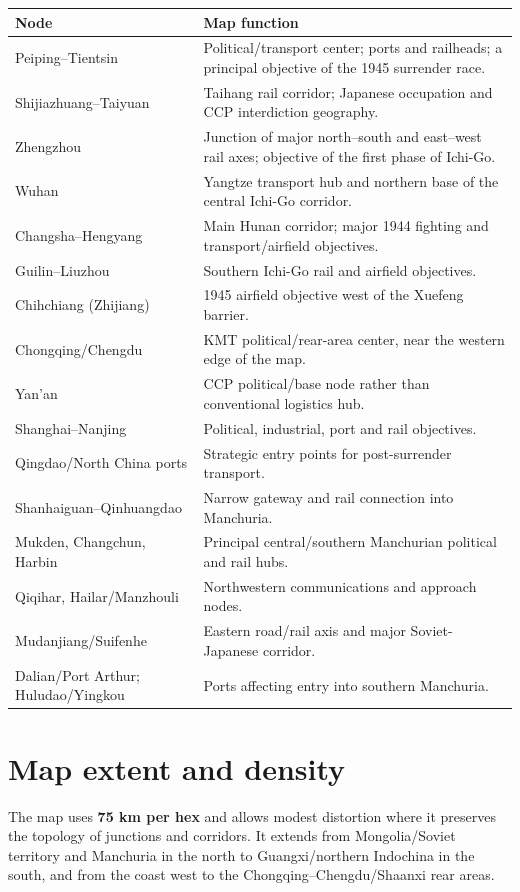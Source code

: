 \documentclass[11pt]{article}
\begin{document}
\begin{longtable}{p{}p{}}
\toprule Node & Map function \\\midrule\endhead
Peiping--Tientsin & Political/transport center; ports and railheads; a principal objective of the 1945 surrender race.\\
Shijiazhuang--Taiyuan & Taihang rail corridor; Japanese occupation and CCP interdiction geography.\\
Zhengzhou & Junction of major north--south and east--west rail axes; objective of the first phase of Ichi-Go.\\
Wuhan & Yangtze transport hub and northern base of the central Ichi-Go corridor.\\
Changsha--Hengyang & Main Hunan corridor; major 1944 fighting and transport/airfield objectives.\\
Guilin--Liuzhou & Southern Ichi-Go rail and airfield objectives.\\
Chihchiang (Zhijiang) & 1945 airfield objective west of the Xuefeng barrier.\\
Chongqing/Chengdu & KMT political/rear-area center, near the western edge of the map.\\
Yan'an & CCP political/base node rather than conventional logistics hub.\\
Shanghai--Nanjing & Political, industrial, port and rail objectives.\\
Qingdao/North China ports & Strategic entry points for post-surrender transport.\\
Shanhaiguan--Qinhuangdao & Narrow gateway and rail connection into Manchuria.\\
Mukden, Changchun, Harbin & Principal central/southern Manchurian political and rail hubs.\\
Qiqihar, Hailar/Manzhouli & Northwestern communications and approach nodes.\\
Mudanjiang/Suifenhe & Eastern road/rail axis and major Soviet-Japanese corridor.\\
Dalian/Port Arthur; Huludao/Yingkou & Ports affecting entry into southern Manchuria.\\
\bottomrule
\end{longtable}

\section{Map extent and density}
The map uses \textbf{75 km per hex} and allows modest distortion where it preserves the topology of junctions and corridors. It extends from Mongolia/Soviet territory and Manchuria in the north to Guangxi/northern Indochina in the south, and from the coast west to the Chongqing--Chengdu/Shaanxi rear areas.
\end{document}
